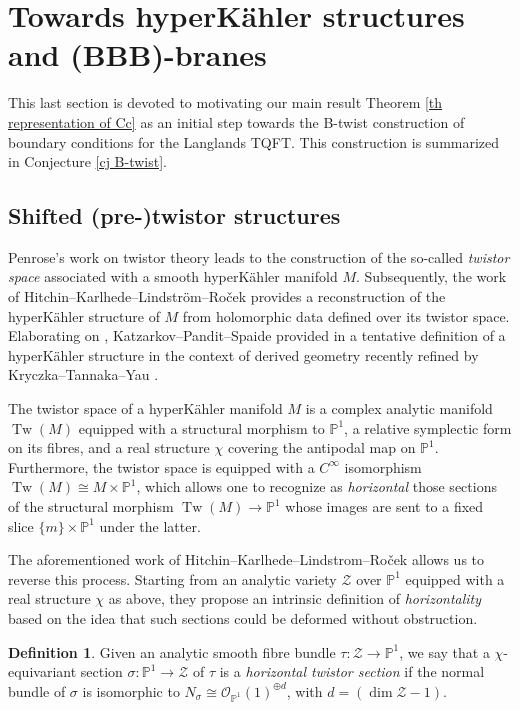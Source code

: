 \documentclass[11pt, a4paper]{amsart}
\numberwithin{equation}{section}
\theoremstyle{definition}
\newtheorem{definition}[theorem]{Definition}
\theoremstyle{remark}
\DeclareMathOperator{\Tw}{Tw}
\newcommand{\Oo}{\mathcal{O}}
\newcommand{\Zz}{\mathcal{Z}}
\newcommand{\PP}{\mathbb{P}}
\renewcommand{\to}{\longrightarrow}
\begin{document}
\section{Towards hyperK\"ahler structures and (BBB)-branes}
\label{sc BBB-branes}

This last section is devoted to motivating our main result Theorem \ref{th representation of Cc} as an initial step towards the B-twist construction of boundary conditions for the Langlands TQFT. This construction is summarized in Conjecture \ref{cj B-twist}.


\subsection{Shifted (pre-)twistor structures}

Penrose's work on twistor theory \cite{penrose} leads to the construction of the so-called \emph{twistor space} associated with a smooth hyperK\"ahler manifold $M$. Subsequently, the work of Hitchin--Karlhede--Lindstr\"om--Ro\v{c}ek \cite{HKLR} provides a reconstruction of the hyperK\"ahler structure of $M$ from holomorphic data defined over its twistor space. Elaborating on \cite{HKLR}, Katzarkov--Pandit--Spaide provided in \cite{KPS} a tentative definition of a hyperK\"ahler structure in the context of derived geometry recently refined by Kryczka--Tannaka--Yau \cite{kryczka&tannaka&yau}. 


The twistor space of a hyperK\"ahler manifold $M$ is a complex analytic manifold $\Tw(M)$ equipped with a structural morphism to $\PP^1$, a relative symplectic form on its fibres, and a real structure $\chi$ covering the antipodal map on $\PP^1$. Furthermore, the twistor space is equipped with a $C^\infty$ isomorphism $\Tw(M) \cong M \times \PP^1$, which allows one to recognize as {\it horizontal} those sections of the structural morphism $\Tw(M) \to \PP^1$ whose images are sent to a fixed slice $\{ m \} \times \PP^1$ under the latter.

The aforementioned work of Hitchin--Karlhede--Lindstrom--Ro\v{c}ek \cite{HKLR} allows us to reverse this process. Starting from an analytic variety $\Zz$ over $\PP^1$ equipped with a real structure $\chi$ as above, they propose an intrinsic definition of {\it horizontality} based on the idea that such sections could be deformed without obstruction.

\begin{definition} \label{def horizontal twistor section in analytic varieties} 
Given an analytic smooth fibre bundle $\tau: \Zz \to \PP^1$, we say that a $\chi$-equivariant section $\sigma: \PP^1 \to \Zz$ of $\tau $ is a \textit{horizontal twistor section} if the normal bundle of $\sigma$ is isomorphic to $N_\sigma \cong \Oo_{\PP^1}(1)^{\oplus d}$, with $d = (\dim \Zz - 1)$.
\end{definition}
\end{document}
